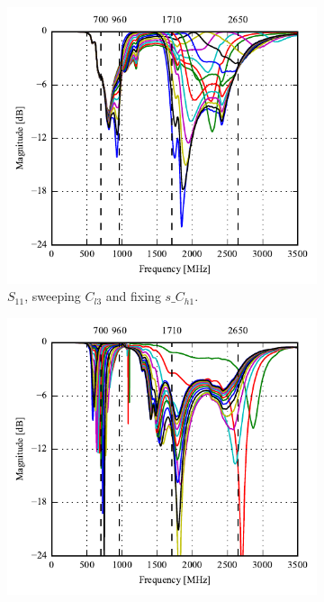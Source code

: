 \begin{figure}[htbp]
   \begin{subfigure}[b]{0.49\linewidth}
        \centering
        \includegraphics{img/tech_sol/nonresonant/simulation/read_mode/s11_top_sweep.pdf}
        \caption{$S_{11}$, sweeping $C_{l3}$ and fixing $s\_C_{h1}$.}
    \end{subfigure}
    \hfill
    \begin{subfigure}[b]{0.49\linewidth}
        \centering
        \includegraphics{img/tech_sol/nonresonant/simulation/read_mode/s22_side_sweep.pdf}

\end{subfigure}
\end{figure}
